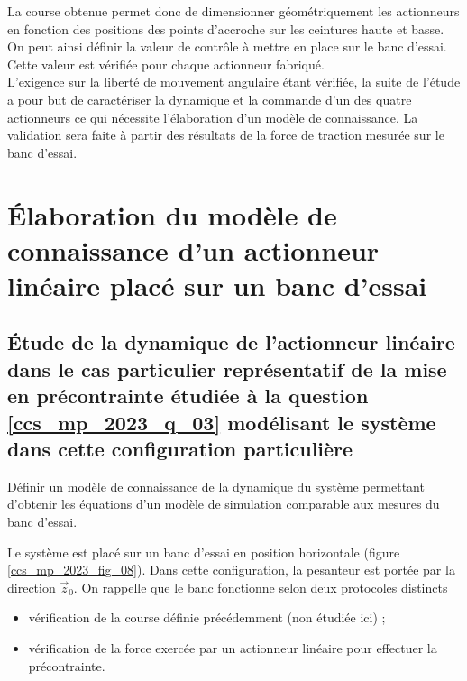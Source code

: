 La course obtenue permet donc de dimensionner géométriquement les actionneurs en fonction des positions des points d'accroche sur les ceintures haute et basse. On peut ainsi définir la valeur de contrôle à mettre en place sur le banc d'essai. Cette valeur est vérifiée pour chaque actionneur fabriqué.\\
L'exigence sur la liberté de mouvement angulaire étant vérifiée, la suite de l'étude a pour but de caractériser la dynamique et la commande d'un des quatre actionneurs ce qui nécessite l'élaboration d'un modèle de connaissance. La validation sera faite à partir des résultats de la force de traction mesurée sur le banc d'essai.

\section{Élaboration du modèle de connaissance d'un actionneur linéaire placé sur un banc d'essai}%
\subsection{Étude de la dynamique de l'actionneur linéaire dans le cas particulier représentatif de la mise en précontrainte étudiée à la question \ref{ccs_mp_2023_q_03} modélisant le système dans cette configuration particulière}

\begin{obj}
Définir un modèle de connaissance de la dynamique du système permettant d'obtenir les équations d'un modèle de simulation comparable aux mesures du banc d'essai.
\end{obj}

Le système est placé sur un banc d'essai en position horizontale (figure \ref{ccs_mp_2023_fig_08}). Dans cette configuration, la pesanteur est portée par la direction $\vec{z}_{0}$. On rappelle que le banc fonctionne selon deux protocoles distincts

\begin{itemize}
  \item vérification de la course définie précédemment (non étudiée ici) ;
  \item vérification de la force exercée par un actionneur linéaire pour effectuer la précontrainte.
\end{itemize}



